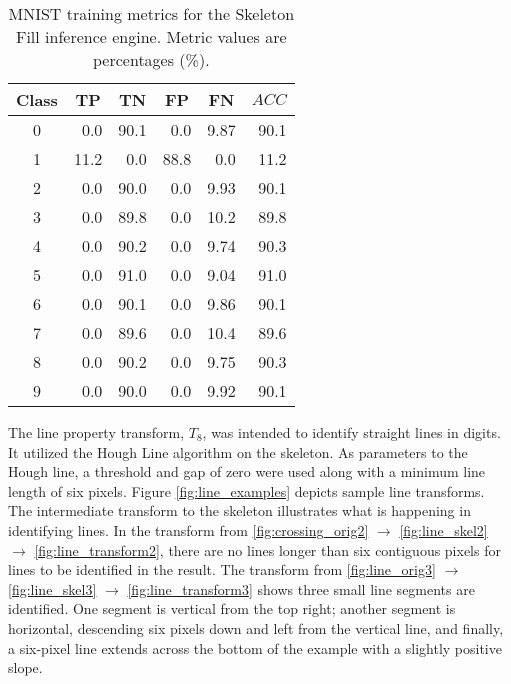 \begin{table}[H]
    \renewcommand{\arraystretch}{1.3}
    \centering
    \caption{MNIST training metrics for the Skeleton Fill inference engine. Metric values are percentages (\%).}
    \begin{tabular}{| c | r | r | r | r | r |}
        \hline
        Class & \multicolumn{1}{|c|}{TP} & \multicolumn{1}{|c|}{TN} & \multicolumn{1}{|c|}{FP} & \multicolumn{1}{|c|}{FN} & \multicolumn{1}{|c|}{$ACC$} \\
        \hline
        \hline
        0 & 0.0 & 90.1 & 0.0 & 9.87 & 90.1 \\ \hline
        1 & 11.2 & 0.0 & 88.8 & 0.0 & 11.2 \\ \hline
        2 & 0.0 & 90.0 & 0.0 & 9.93 & 90.1 \\ \hline
        3 & 0.0 & 89.8 & 0.0 & 10.2 & 89.8 \\ \hline
        4 & 0.0 & 90.2 & 0.0 & 9.74 & 90.3 \\ \hline
        5 & 0.0 & 91.0 & 0.0 & 9.04 & 91.0 \\ \hline
        6 & 0.0 & 90.1 & 0.0 & 9.86 & 90.1 \\ \hline
        7 & 0.0 & 89.6 & 0.0 & 10.4 & 89.6 \\ \hline
        8 & 0.0 & 90.2 & 0.0 & 9.75 & 90.3 \\ \hline
        9 & 0.0 & 90.0 & 0.0 & 9.92 & 90.1 \\
        \hline
    \end{tabular}
    \label{tab:skel_fill_metrics}
\end{table}

The line property transform, $T_8$, was intended to identify straight lines in
digits. It utilized the Hough Line algorithm on the skeleton. As parameters to
the Hough line, a threshold and gap of zero were used along with a minimum line
length of six pixels. Figure \ref{fig:line_examples} depicts sample line
transforms. The intermediate transform to the skeleton illustrates what is
happening in identifying lines. In the transform from \ref{fig:crossing_orig2}
$\rightarrow$ \ref{fig:line_skel2} $\rightarrow$ \ref{fig:line_transform2},
there are no lines longer than six contiguous pixels for lines to be identified
in the result. The transform from \ref{fig:line_orig3} $\rightarrow$
\ref{fig:line_skel3} $\rightarrow$ \ref{fig:line_transform3} shows three small
line segments are identified. One segment is vertical from the top right;
another segment is horizontal, descending six pixels down and left from the
vertical line, and finally, a six-pixel line extends across the bottom of the
example with a slightly positive slope.

